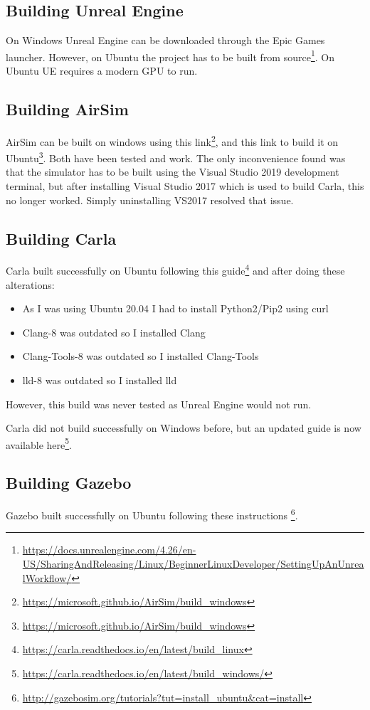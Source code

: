 \subsection{Building Unreal Engine}
On Windows Unreal Engine can be downloaded through the Epic Games launcher. However, on Ubuntu the project has to be built from source\footnote{\url{https://docs.unrealengine.com/4.26/en-US/SharingAndReleasing/Linux/BeginnerLinuxDeveloper/SettingUpAnUnrealWorkflow/}}. On Ubuntu UE requires a modern GPU to run. 

\subsection{Building AirSim}
AirSim can be built on windows using this link\footnote{\url{https://microsoft.github.io/AirSim/build_windows}}, and this link to build it on Ubuntu\footnote{\url{https://microsoft.github.io/AirSim/build_windows}}. Both have been tested and work. The only inconvenience found was that the simulator has to be built using the Visual Studio 2019 development terminal, but after installing Visual Studio 2017 which is used to build Carla, this no longer worked. Simply uninstalling VS2017 resolved that issue. 

\subsection{Building Carla}
Carla built successfully on Ubuntu following this guide\footnote{\url{https://carla.readthedocs.io/en/latest/build_linux}} and after doing these alterations:
\begin{itemize}
    \item As I was using Ubuntu 20.04 I had to install Python2/Pip2 using curl
\item Clang-8 was outdated so I installed Clang
\item Clang-Tools-8 was outdated so I installed Clang-Tools
\item lld-8 was outdated so I installed lld
\end{itemize}
However, this build was never tested as Unreal Engine would not run. 

Carla did not build successfully on Windows before, but an updated guide is now available here\footnote{\url{https://carla.readthedocs.io/en/latest/build_windows/}}. 

\subsection{Building Gazebo}
Gazebo built successfully on Ubuntu following these instructions \footnote{\url{http://gazebosim.org/tutorials?tut=install_ubuntu&cat=install}}.


